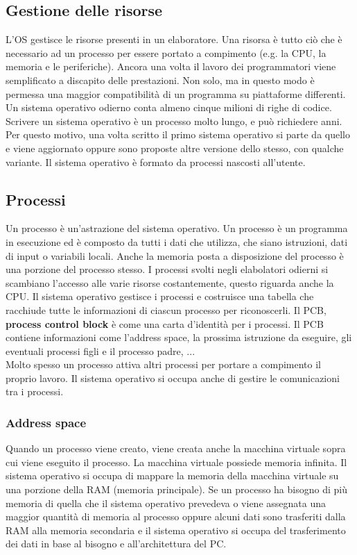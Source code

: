 \documentclass{article}
\begin{document}
\subsection{Gestione delle risorse}
L'OS gestisce le risorse presenti in un elaboratore. Una risorsa è tutto ciò che è necessario ad un processo per essere portato a compimento (e.g. la CPU, la memoria e le periferiche). Ancora una volta il lavoro dei programmatori viene semplificato a discapito delle prestazioni. Non solo, ma in questo modo è permessa una maggior compatibilità di un programma su piattaforme differenti.\\

Un sistema operativo odierno conta almeno cinque milioni di righe di codice. Scrivere un sistema operativo è un processo molto lungo, e può richiedere anni. Per questo motivo, una volta scritto il primo sistema operativo si parte da quello e viene aggiornato oppure sono proposte altre versione dello stesso, con qualche variante. Il sistema operativo è formato da processi nascosti all'utente.

\subsection{Processi}
Un processo è un'astrazione del sistema operativo. Un processo è un programma in esecuzione ed è composto da tutti i dati che utilizza, che siano istruzioni, dati di input o variabili locali. Anche la memoria posta a disposizione del processo è una porzione del processo stesso. I processi svolti negli elabolatori odierni si scambiano l'accesso alle varie risorse costantemente, questo riguarda anche la CPU. Il sistema operativo gestisce i processi e costruisce una tabella che racchiude tutte le informazioni di ciascun processo per riconoscerli. Il PCB, \textbf{process control block} è come una carta d'identità per i processi. Il PCB contiene informazioni come l'address space, la prossima istruzione da eseguire, gli eventuali processi figli e il processo padre, ...\\
Molto spesso un processo attiva altri processi per portare a compimento il proprio lavoro. Il sistema operativo si occupa anche di gestire le comunicazioni tra i processi.

\subsubsection{Address space}
Quando un processo viene creato, viene creata anche la macchina virtuale sopra cui viene eseguito il processo. La macchina virtuale possiede memoria infinita. Il sistema operativo si occupa di mappare la memoria della macchina virtuale su una porzione della RAM (memoria principale). Se un processo ha bisogno di più memoria di quella che il sistema operativo prevedeva o viene assegnata una maggior quantità di memoria al processo oppure alcuni dati sono trasferiti dalla RAM alla memoria secondaria e il sistema operativo si occupa del trasferimento dei dati in base al bisogno e all'architettura del PC.
\end{document}
